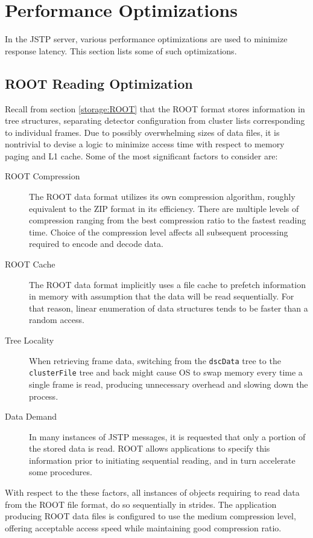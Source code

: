 \section{Performance Optimizations}
In the JSTP server, various performance optimizations are used to minimize response latency. This section lists some of such optimizations.

\subsection{ROOT Reading Optimization}
Recall from section \ref{storage:ROOT} that the ROOT format stores information in tree structures, separating detector configuration from cluster lists corresponding to individual frames. Due to possibly overwhelming sizes of data files, it is nontrivial to devise a logic to minimize access time with respect to memory paging and L1 cache. Some of the most significant factors to consider are:

\begin{description}
	\item[ROOT Compression]
	The ROOT data format utilizes its own compression algorithm, roughly equivalent to the ZIP format in its efficiency. There are multiple levels of compression ranging from the best compression ratio to the fastest reading time. Choice of the compression level affects all subsequent processing required to encode and decode data.

	\item[ROOT Cache]
	The ROOT data format implicitly uses a file cache to prefetch information in memory with assumption that the data will be read sequentially. For that reason, linear enumeration of data structures tends to be faster than a random access.

	\item[Tree Locality]
	When retrieving frame data, switching from the \texttt{dscData} tree to the \texttt{clusterFile} tree and back might cause OS to swap memory every time a single frame is read, producing unnecessary overhead and slowing down the process.

	\item[Data Demand]
	In many instances of JSTP messages, it is requested that only a portion of the stored data is read. ROOT allows applications to specify this information prior to initiating sequential reading, and in turn accelerate some procedures.
\end{description}

With respect to the these factors, all instances of objects requiring to read data from the ROOT file format, do so sequentially in strides. The application producing ROOT data files is configured to use the medium compression level, offering acceptable access speed while maintaining good compression ratio.

